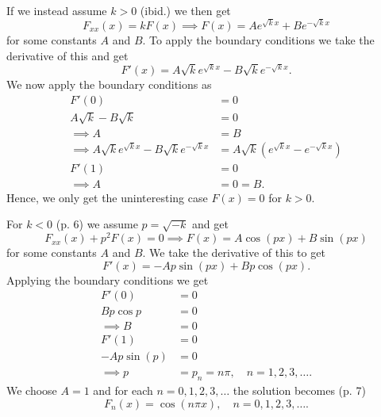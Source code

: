 \begin{derivation}
\begin{enumerate}[label=\alph*)]
      If we instead assume $k>0$ (ibid.) we then get
      \begin{equation*}
        F_{x x}(x) = kF(x) \implies F(x) = A e^{\sqrt{k}x} + Be^{-\sqrt{k}x}
      \end{equation*}
      for some constants $A$ and $B$.
      To apply the boundary conditions we take the derivative of this and get
      \begin{equation*}
        F'(x) = A\sqrt{k} e^{\sqrt{k}x} - B \sqrt{k} e^{-\sqrt{k}x}
      .\end{equation*}
      We now apply the boundary conditions as
      \begin{align*}
        F'(0) &= 0 \\
        A \sqrt{k} - B \sqrt{k} &= 0\\
        \implies A &= B \\
        \implies A \sqrt{k} e^{\sqrt{k}x} - B \sqrt{k} e^{-\sqrt{k}x} &= A \sqrt{k}\left( e^{\sqrt{k}x} - e^{-\sqrt{k}x} \right) \\
        F'(1) &= 0 \\
        \implies A &= 0 = B
      .\end{align*}
      Hence, we only get the uninteresting case $F(x) = 0$ for $k > 0$.

      For $k < 0$ (p. 6) we assume $p = \sqrt{-k}$ and get
      \begin{equation*}
        F_{x x}(x) + p^2 F(x) = 0 \implies F(x) = A \cos (px) +  B \sin (px) 
      \end{equation*}
      for some constants $A$ and $B$.
      We take the derivative of this to get
      \begin{equation*}
        F'(x) = - Ap \sin (px) + B p \cos(px)
      .\end{equation*}
      Applying the boundary conditions we get
      \begin{align*}
        F'(0) &= 0 \\
        B p \cos p &= 0 \\
        \implies B &= 0 \\
        F'(1) &= 0 \\
        - Ap \sin (p) &= 0 \\
        \implies p &= p_n = n\pi, \quad n = 1,2,3,\ldots 
      .\end{align*}
      We choose $A= 1$ and for each $n = 0,1,2,3,\ldots $ the solution becomes (p. 7)
      \begin{equation*}
        F_n(x) = \cos \left( n \pi x \right), \quad n = 0,1,2,3,\ldots 
      .\end{equation*}
      

\end{enumerate}
\end{derivation}
